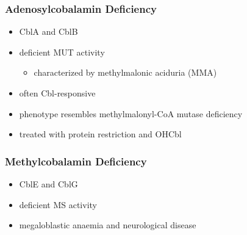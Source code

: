 \documentclass{scrartcl}
\begin{document}
\subsubsection{Adenosylcobalamin Deficiency}
\label{sec:orgbfb9715}
\begin{itemize}
\item CblA and CblB
\item deficient MUT activity
\begin{itemize}
\item characterized by methylmalonic aciduria (MMA)
\end{itemize}
\item often Cbl-responsive
\item phenotype resembles methylmalonyl-CoA mutase deficiency
\item treated with protein restriction and OHCbl
\end{itemize}

\subsubsection{Methylcobalamin Deficiency}
\label{sec:org8ba4c02}
\begin{itemize}
\item CblE and CblG
\item deficient MS activity
\item megaloblastic anaemia and neurological disease
\end{itemize}
\end{document}
